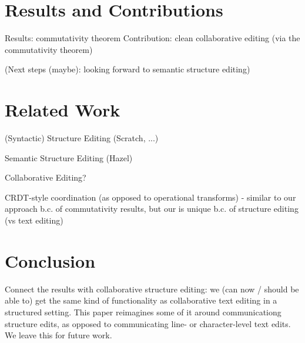 \documentclass[nonacm, acmsmall, screen, review]{acmart}
\begin{document}


\section{Results and Contributions}

Results: commutativity theorem
Contribution: clean collaborative editing (via the commutativity theorem)

(Next steps (maybe): looking forward to semantic structure editing)


\section{Related Work}

(Syntactic) Structure Editing (Scratch, ...)


Semantic Structure Editing (Hazel)

Collaborative Editing?

CRDT-style coordination (as opposed to operational transforms)
- similar to our approach b.c. of commutativity results, but our is unique b.c. of structure editing (vs text editing)


\section{Conclusion}

Connect the results with collaborative structure editing: we (can now / should be able to) get the same kind of functionality as collaborative text editing in a structured setting. 
This paper reimagines some of it around communicationg structure edits, as opposed to communicating line- or character-level text edits.
We leave this for future work.
\end{document}
